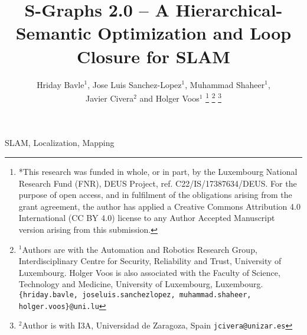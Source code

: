 \documentclass[letterpaper, 10 pt, journal, twoside]{IEEEtran}
\begin{document}

\title{\LARGE \bf {S-Graphs 2.0} -- A Hierarchical-Semantic Optimization and Loop Closure for SLAM}


\author{Hriday Bavle$^{1}$, Jose Luis Sanchez-Lopez$^{1}$, Muhammad Shaheer$^{1}$, \\ Javier Civera$^{2}$ and Holger Voos$^{1}$ %
\thanks{*This research was funded in whole, or in part, by the Luxembourg National Research Fund (FNR), DEUS Project, ref. C22/IS/17387634/DEUS. For the purpose of open access, and in fulfilment of the obligations arising from the grant agreement, the author has applied a Creative Commons Attribution 4.0 International (CC BY 4.0) license to any  Author Accepted Manuscript version arising from this submission.}%
\thanks{$^{1}$Authors are with the Automation and Robotics Research Group, Interdisciplinary Centre for Security, Reliability and Trust, University of Luxembourg. Holger Voos is also associated with the Faculty of Science, Technology and Medicine, University of Luxembourg, Luxembourg.
\tt{\small{\{hriday.bavle, joseluis.sanchezlopez, muhammad.shaheer, holger.voos\}}@uni.lu}}%
\thanks{$^{2}$Author is with I3A, Universidad de Zaragoza, Spain
{\tt\small jcivera@unizar.es}}%
}


\maketitle




\begin{IEEEkeywords}
SLAM, Localization, Mapping
\end{IEEEkeywords}







%
\end{document}
